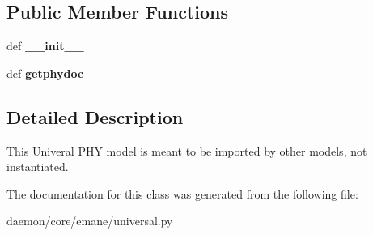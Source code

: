 \subsection*{Public Member Functions}
\begin{DoxyCompactItemize}
\item 
\hypertarget{classcore_1_1emane_1_1universal_1_1_emane_universal_model_ab7d9ab17067efdaca7ab71a86ff62098}{def {\bfseries \+\_\+\+\_\+init\+\_\+\+\_\+}}\label{classcore_1_1emane_1_1universal_1_1_emane_universal_model_ab7d9ab17067efdaca7ab71a86ff62098}

\item 
\hypertarget{classcore_1_1emane_1_1universal_1_1_emane_universal_model_a452b5294982053c55518e0b921e0b2c7}{def {\bfseries getphydoc}}\label{classcore_1_1emane_1_1universal_1_1_emane_universal_model_a452b5294982053c55518e0b921e0b2c7}

\end{DoxyCompactItemize}


\subsection{Detailed Description}
\begin{DoxyVerb}This Univeral PHY model is meant to be imported by other models,
    not instantiated.
\end{DoxyVerb}
 

The documentation for this class was generated from the following file\+:\begin{DoxyCompactItemize}
\item 
daemon/core/emane/universal.\+py\end{DoxyCompactItemize}
